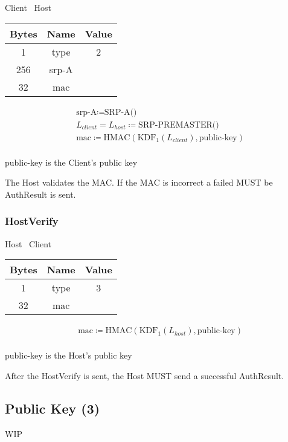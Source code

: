 \begin{center}
    Client \textrightarrow\ Host\\
    \begin{tabular}{|c|c|c|}
        \hline
        \textbf{Bytes} & \textbf{Name} & \textbf{Value} \\
        \hline
        1              & type          & 2              \\
        \hline
        256            & srp-A         &                \\
        \hline
        32             & mac           &                \\
        \hline
    \end{tabular}
\end{center}

\begin{align*}
    & \text{srp-A} \coloneqq \text{SRP-A()}\\
    & L_{client} = L_{host} \coloneqq \text{SRP-PREMASTER()}\\
    & \text{mac} \coloneqq \text{HMAC}(\text{KDF}_1(L_{client}), \text{public-key})\\
\end{align*}

public-key is the Client's public key

The Host validates the MAC.
If the MAC is incorrect a failed MUST be AuthResult is sent.

\subsubsection{HostVerify}

\begin{center}
    Host \textrightarrow\ Client\\
    \begin{tabular}{|c|c|c|}
        \hline
        \textbf{Bytes} & \textbf{Name} & \textbf{Value} \\
        \hline
        1              & type          & 3              \\
        \hline
        32             & mac           &                \\
        \hline
    \end{tabular}
\end{center}

\begin{align*}
    & \text{mac} \coloneqq \text{HMAC}(\text{KDF}_1(L_{host}), \text{public-key})\\
\end{align*}

public-key is the Host's public key

After the HostVerify is sent, the Host MUST send a successful AuthResult.

\subsection{Public Key (3)}

WIP